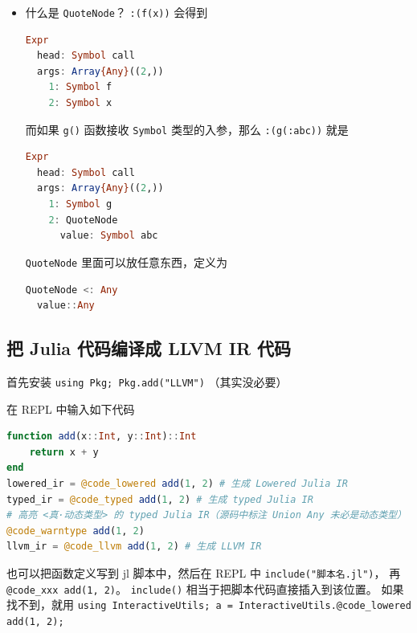 \begin{itemize}
\begin{lstlisting}[language=julia]
        a::Int64
        b::String
    end
end
\end{lstlisting}
\verb`dump(Base.remove_linenums!(st))` 的结果是
\begin{lstlisting}[language=julia]
Expr
  head: Symbol block
  args: Array{Any}((1,))
    1: Expr
      head: Symbol struct
      args: Array{Any}((3,))
        1: Bool false
        2: Symbol MySt
        3: Expr
          head: Symbol block
          args: Array{Any}((2,))
            1: Expr
              head: Symbol ::
              args: Array{Any}((2,))
                1: Symbol a
                2: Symbol Int64
            2: Expr
              head: Symbol ::
              args: Array{Any}((2,))
                1: Symbol b
                2: Symbol String
\end{lstlisting}
\item 什么是 \verb`QuoteNode`？ \verb`:(f(x))` 会得到
\begin{lstlisting}[language=julia]
Expr
  head: Symbol call
  args: Array{Any}((2,))
    1: Symbol f
    2: Symbol x
\end{lstlisting}
而如果 \verb`g()` 函数接收 \verb`Symbol` 类型的入参，那么 \verb`:(g(:abc))` 就是
\begin{lstlisting}[language=julia]
Expr
  head: Symbol call
  args: Array{Any}((2,))
    1: Symbol g
    2: QuoteNode
      value: Symbol abc
\end{lstlisting}
\verb`QuoteNode` 里面可以放任意东西，定义为
\begin{lstlisting}[language=julia]
QuoteNode <: Any
  value::Any
\end{lstlisting}
\end{itemize}


\subsection{把 Julia 代码编译成 LLVM IR 代码}
首先安装 \verb`using Pkg; Pkg.add("LLVM")` （其实没必要）

在 REPL 中输入如下代码
\begin{lstlisting}[language=julia,caption=julia]
function add(x::Int, y::Int)::Int
    return x + y
end
lowered_ir = @code_lowered add(1, 2) # 生成 Lowered Julia IR
typed_ir = @code_typed add(1, 2) # 生成 typed Julia IR
# 高亮 <真·动态类型> 的 typed Julia IR（源码中标注 Union Any 未必是动态类型）
@code_warntype add(1, 2)
llvm_ir = @code_llvm add(1, 2) # 生成 LLVM IR
\end{lstlisting}

也可以把函数定义写到 jl 脚本中，然后在 REPL 中 \verb`include("脚本名.jl")`， 再 \verb`@code_xxx add(1, 2)`。 \verb`include()` 相当于把脚本代码直接插入到该位置。 如果找不到，就用 \verb`using InteractiveUtils; a = InteractiveUtils.@code_lowered add(1, 2);`

